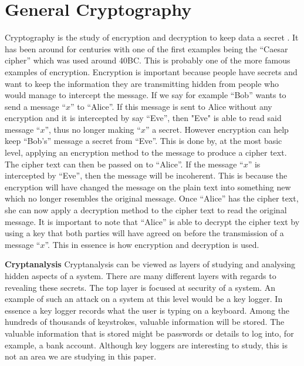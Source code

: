 \documentclass[11pt,a4paper, notitlepage]{report}
\begin{document}
\section{General Cryptography}
\label{sec:GenCrypt}


Cryptography is the study of encryption and decryption to keep data a secret \cite{DBLP:series/isc/DelfsK07}. It has been around for centuries with one of the first examples being the “Caesar cipher” which was used around 40BC. This is probably one of the more famous examples of encryption.
Encryption is important because people have secrets and want to keep the information they are transmitting hidden from people who would manage to intercept the message. If we say for example “Bob” wants to send a message “$x$” to “Alice”. If this message is sent to Alice without any encryption and it is intercepted by say “Eve”, then "Eve" is able to read said message “$x$”, thus no longer making “$x$” a secret. However encryption can help keep “Bob's” message a secret from “Eve”. This is done by, at the most basic level, applying an encryption method to the message to produce a cipher text. The cipher text can then be passed on to “Alice”. If the message “$x$” is intercepted by “Eve”, then the message will be incoherent. This is because the encryption will have changed the message on the plain text into something new which no longer resembles the original message. Once “Alice” has the cipher text, she can now apply a decryption method to the cipher text to read the original message. It is important to note that “Alice” is able to decrypt the cipher text by using a key that both parties will have agreed on before the transmission of a message “$x$”. This in essence is how encryption and decryption is used.\newline

\textbf{Cryptanalysis} \newline
Cryptanalysis can be viewed as layers of studying and analysing hidden aspects of a system. There are many different layers with regards to revealing these secrets. The top layer is focused at security of a system. An example of such an attack on a system at this level would be a key logger. In essence a key logger records what the user is typing on a keyboard. Among the hundreds of thousands of keystrokes, valuable information will be stored. The valuable information that is stored might be passwords or details to log into, for example, a bank account. Although key loggers are interesting to study, this is not an area we are studying in this paper. 
\end{document}

